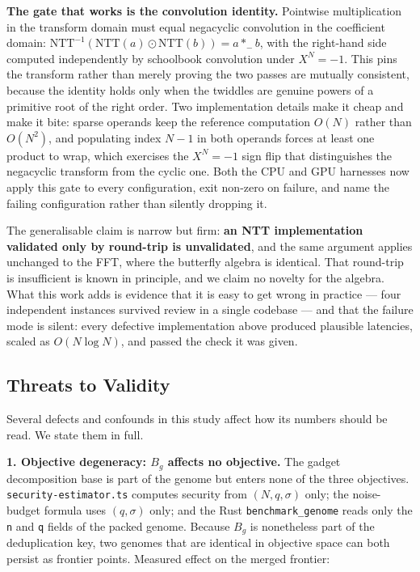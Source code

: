 \textbf{The gate that works is the convolution identity.} Pointwise multiplication in the transform domain must equal negacyclic convolution in the coefficient domain: \(\text{NTT}^{-1}(\text{NTT}(a) \odot \text{NTT}(b)) = a \ast_{-} b\), with the right-hand side computed independently by schoolbook convolution under \(X^N = -1\). This pins the transform rather than merely proving the two passes are mutually consistent, because the identity holds only when the twiddles are genuine powers of a primitive root of the right order. Two implementation details make it cheap and make it bite: sparse operands keep the reference computation \(O(N)\) rather than \(O(N^2)\), and populating index \(N - 1\) in both operands forces at least one product to wrap, which exercises the \(X^N = -1\) sign flip that distinguishes the negacyclic transform from the cyclic one. Both the CPU and GPU harnesses now apply this gate to every configuration, exit non-zero on failure, and name the failing configuration rather than silently dropping it.

The generalisable claim is narrow but firm: \textbf{an NTT implementation validated only by round-trip is unvalidated}, and the same argument applies unchanged to the FFT, where the butterfly algebra is identical. That round-trip is insufficient is known in principle, and we claim no novelty for the algebra. What this work adds is evidence that it is easy to get wrong in practice --- four independent instances survived review in a single codebase --- and that the failure mode is silent: every defective implementation above produced plausible latencies, scaled as \(O(N \log N)\), and passed the check it was given.

\subsection{Threats to Validity}\label{threats-to-validity}

Several defects and confounds in this study affect how its numbers should be read. We state them in full.

\textbf{1. Objective degeneracy: \(B_g\) affects no objective.} The gadget decomposition base is part of the genome but enters none of the three objectives. \texttt{security-estimator.ts} computes security from \((N, q, \sigma)\) only; the noise-budget formula uses \((q, \sigma)\) only; and the Rust \texttt{benchmark\_genome} reads only the \texttt{n} and \texttt{q} fields of the packed genome. Because \(B_g\) is nonetheless part of the deduplication key, two genomes that are identical in objective space can both persist as frontier points. Measured effect on the merged frontier:

